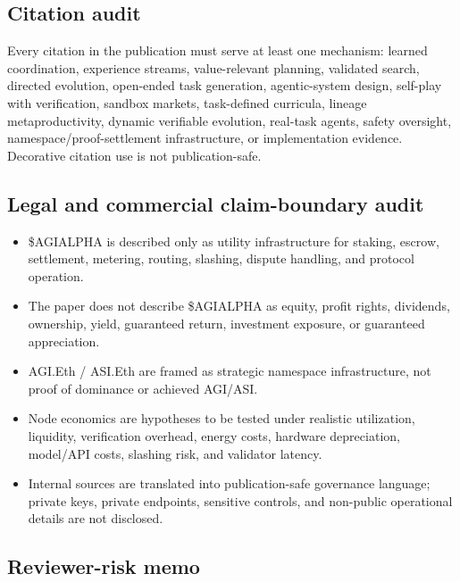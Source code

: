 \documentclass[
  11pt,
]{article}
\providecommand{\tightlist}{%
  \setlength{\itemsep}{0pt}\setlength{\parskip}{0pt}}
\begin{document}
\subsection{Citation audit}\label{citation-audit}

Every citation in the publication must serve at least one mechanism:
learned coordination, experience streams, value-relevant planning,
validated search, directed evolution, open-ended task generation,
agentic-system design, self-play with verification, sandbox markets,
task-defined curricula, lineage metaproductivity, dynamic verifiable
evolution, real-task agents, safety oversight,
namespace/proof-settlement infrastructure, or implementation evidence.
Decorative citation use is not publication-safe.

\subsection{Legal and commercial claim-boundary
audit}\label{legal-and-commercial-claim-boundary-audit}

\begin{itemize}
\tightlist
\item
  \$AGIALPHA is described only as utility infrastructure for staking,
  escrow, settlement, metering, routing, slashing, dispute handling, and
  protocol operation.
\item
  The paper does not describe \$AGIALPHA as equity, profit rights,
  dividends, ownership, yield, guaranteed return, investment exposure,
  or guaranteed appreciation.
\item
  AGI.Eth / ASI.Eth are framed as strategic namespace infrastructure,
  not proof of dominance or achieved AGI/ASI.
\item
  Node economics are hypotheses to be tested under realistic
  utilization, liquidity, verification overhead, energy costs, hardware
  depreciation, model/API costs, slashing risk, and validator latency.
\item
  Internal sources are translated into publication-safe governance
  language; private keys, private endpoints, sensitive controls, and
  non-public operational details are not disclosed.
\end{itemize}

\subsection{Reviewer-risk memo}\label{reviewer-risk-memo}
\end{document}
